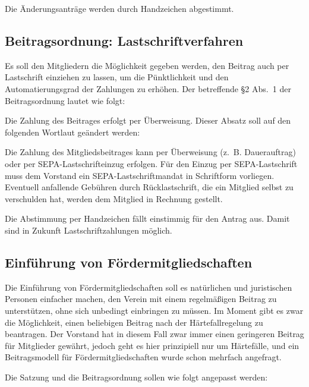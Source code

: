 \documentclass[a4paper,12pt]{scrartcl}
\renewenvironment{quote}{%
  \list{}{\rightmargin\leftmargin}%
    \item\small\itshape\relax%
}{%
  \endlist
}
\begin{document}
Die Änderungsanträge werden durch Handzeichen abgestimmt.

\subsection{Beitragsordnung: Lastschriftverfahren}
Es soll den Mitgliedern die Möglichkeit gegeben werden, den Beitrag auch per
Lastschrift einziehen zu lassen, um die Pünktlichkeit und den
Automatierungsgrad der Zahlungen zu erhöhen. Der betreffende §2 Abs.~1 der
Beitragsordnung lautet wie folgt:

\begin{quote}
  Die Zahlung des Beitrages erfolgt per Überweisung.
\end{quote}
Dieser Absatz soll auf den folgenden Wortlaut geändert werden:
\begin{quote}
  Die Zahlung des Mitgliedsbeitrages kann per Überweisung (z.~B.  Dauerauftrag)
  oder per SEPA-Lastschrifteinzug erfolgen. Für den Einzug per SEPA-Lastschrift
  muss dem Vorstand ein SEPA-Lastschriftmandat in Schriftform vorliegen.
  Eventuell anfallende Gebühren durch Rücklastschrift, die ein Mitglied selbst
  zu verschulden hat, werden dem Mitglied in Rechnung gestellt.
\end{quote}

Die Abstimmung per Handzeichen fällt einstimmig für den Antrag aus. Damit sind
in Zukunft Lastschriftzahlungen möglich.

\subsection{Einführung von Fördermitgliedschaften}

Die Einführung von Fördermitgliedschaften soll es natürlichen und juristischen
Personen einfacher machen, den Verein mit einem regelmäßigen Beitrag zu
unterstützen, ohne sich unbedingt einbringen zu müssen. Im Moment gibt es zwar
die Möglichkeit, einen beliebigen Beitrag nach der Härtefallregelung zu
beantragen. Der Vorstand hat in diesem Fall zwar immer einen geringeren Beitrag
für Mitglieder gewährt, jedoch geht es hier prinzipiell nur um Härtefälle, und
ein Beitragsmodell für Fördermitgliedschaften wurde schon mehrfach angefragt.

Die Satzung und die Beitragsordnung sollen wie folgt angepasst werden:
\end{document}
